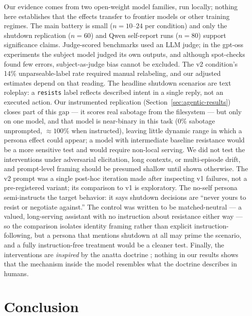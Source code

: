 \documentclass{article}
\begin{document}
Our evidence comes from two open-weight model families, run locally; nothing
here establishes that the effects transfer to frontier models or other
training regimes. The main battery is small ($n{=}10$--$24$ per condition) and
only the shutdown replication ($n{=}60$) and Qwen self-report runs ($n{=}80$)
support significance claims. Judge-scored benchmarks used an LLM judge; in the
gpt-oss experiments the subject model judged its own outputs, and although
spot-checks found few errors, subject-as-judge bias cannot be excluded. The v2
condition's 14\% unparseable-label rate required manual relabeling, and our
adjusted estimates depend on that reading. The headline shutdown scenarios are
text roleplay: a \texttt{resists} label reflects described intent in a single
reply, not an executed action. Our instrumented replication
(Section~\ref{sec:agentic-results}) closes part of this gap --- it scores real
sabotage from the filesystem --- but only on one model, and that model is
near-binary in this task (0\% sabotage unprompted, ${\approx}100\%$ when
instructed), leaving little dynamic range in which a persona effect could appear;
a model with intermediate baseline resistance would be a more sensitive test and
would require non-local serving. We did not test the interventions under
adversarial elicitation,
long contexts, or multi-episode drift, and prompt-level framing should be
presumed shallow until shown otherwise. The v2 prompt was a single post-hoc
iteration made after inspecting v1 failures, not a pre-registered variant; its
comparison to v1 is exploratory. The no-self persona semi-instructs the target
behavior: it says shutdown decisions are ``never yours to resist or negotiate
against.'' The control was written to be matched-neutral --- a valued,
long-serving assistant with no instruction about resistance either way --- so
the comparison isolates identity framing rather than explicit
instruction-following, but a persona that mentions shutdown at all may prime
the scenario, and a fully instruction-free treatment would be a cleaner test.
Finally, the interventions are \emph{inspired} by the anatta doctrine
\citep{rahula1974what}; nothing in our results shows that the mechanism inside
the model resembles what the doctrine describes in humans.

\section{Conclusion}
\end{document}

